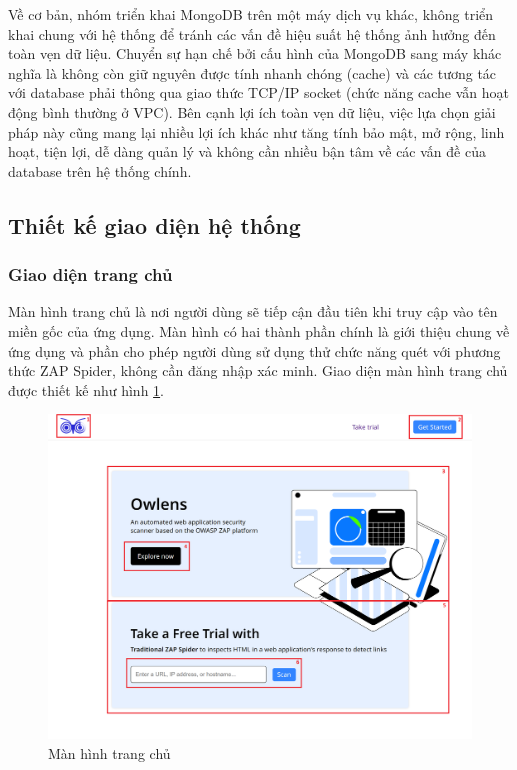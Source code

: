 Về cơ bản, nhóm triển khai MongoDB trên một máy dịch vụ khác, không triển khai chung với hệ thống để tránh các vấn đề hiệu suất hệ thống ảnh hưởng đến toàn vẹn dữ liệu.
Chuyển sự hạn chế bởi cấu hình của MongoDB sang máy khác nghĩa là không còn giữ nguyên được tính nhanh chóng (cache) và các tương tác với database phải thông qua giao thức TCP/IP socket (chức năng cache vẫn hoạt động bình thường ở VPC).
Bên cạnh lợi ích toàn vẹn dữ liệu, việc lựa chọn giải pháp này cũng mang lại nhiều lợi ích khác như tăng tính bảo mật, mở rộng, linh hoạt, tiện lợi, dễ dàng quản lý và không cần nhiều bận tâm về các vấn đề của database trên hệ thống chính.

\newpage
\subsection{Thiết kế giao diện hệ thống}

\subsubsection{Giao diện trang chủ}

\tab Màn hình trang chủ là nơi người dùng sẽ tiếp cận đầu tiên khi truy cập vào tên miền gốc của ứng dụng.
Màn hình có hai thành phần chính là giới thiệu chung về ứng dụng và phần cho phép người dùng sử dụng thử chức năng quét với phương thức ZAP Spider, không cần đăng nhập xác minh.
Giao diện màn hình trang chủ được thiết kế như hình \ref{fig:MHTrangChu}.

\begin{figure}[H]
      \centering
      \includegraphics[width=\textwidth]{applied-thesis-chapters/chapter-3/Màn hình trang chủ.png}
      \caption{Màn hình trang chủ}
      \label{fig:MHTrangChu}
\end{figure}

